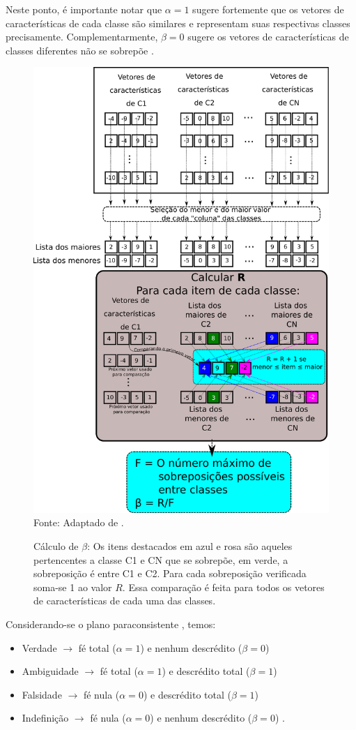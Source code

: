 			\par Neste ponto, é importante notar que $\alpha=1$ sugere fortemente que os vetores de características de cada classe são similares e representam suas respectivas classes precisamente. Complementarmente, $\beta=0$ sugere os vetores de características de classes diferentes não se sobrepõe \cite{8588433}.
			
			\begin{figure}[h]
				\centering
				\caption{Cálculo de $\beta$: Os itens destacados em azul e rosa são aqueles pertencentes a classe C1 e CN que se sobrepõe, em verde, a sobreposição é entre C1 e C2. Para cada sobreposição verificada soma-se 1 ao valor $R$. Essa comparação é feita para todos os vetores de características de cada uma das classes.}
				\includegraphics[width=0.5\linewidth]{images/betaCalculation.pdf}
				\label{fig:betacalculation}
				\\Fonte: Adaptado de \cite{8588433}.
			\end{figure}
			
			\par Considerando-se o plano paraconsistente \cite{8588433}, temos: 
			
			\begin{itemize}
				\item Verdade $\rightarrow$ fé total ($\alpha = 1$) e nenhum descrédito ($\beta = 0$)
				\item Ambiguidade $\rightarrow$ fé total ($\alpha = 1$) e descrédito total ($\beta = 1$)
				\item Falsidade $\rightarrow$ fé nula ($\alpha = 0$) e descrédito total ($\beta = 1$)
				\item Indefinição $\rightarrow$ fé nula ($\alpha = 0$) e nenhum descrédito ($\beta = 0$) \qquad.
			\end{itemize}
	

